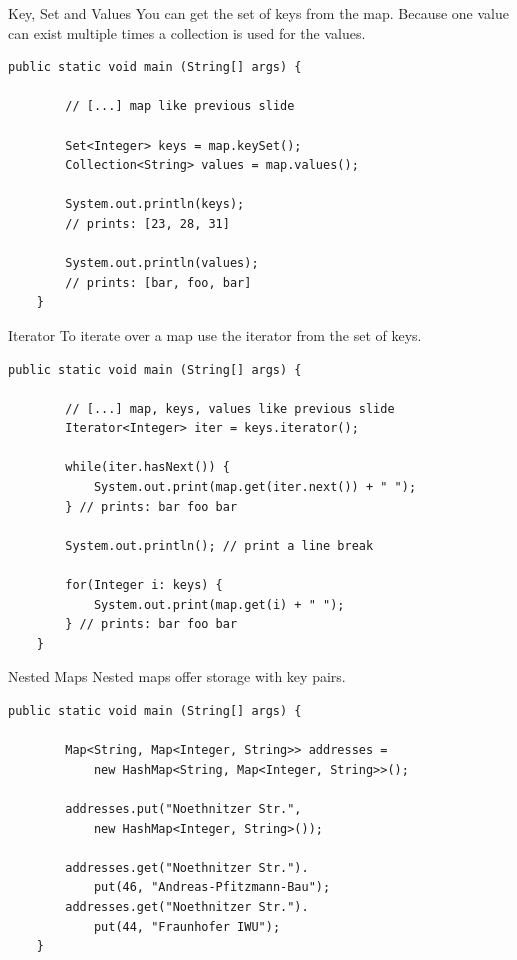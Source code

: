 \begin{frame}[fragile]{Key, Set and Values}
	You can get the set of keys from the map.
	Because one value can exist multiple times a collection is used for the values.
	\begin{lstlisting}[basicstyle=\ttfamily\scriptsize]
	public static void main (String[] args) {
	
	    // [...] map like previous slide
	    
	    Set<Integer> keys = map.keySet();
	    Collection<String> values = map.values();
	    
	    System.out.println(keys);
	    // prints: [23, 28, 31]
	    
	    System.out.println(values);
	    // prints: [bar, foo, bar]
	}
	\end{lstlisting}
\end{frame}

\begin{frame}[fragile]{Iterator}
	To iterate over a map use the iterator from the set of keys.
	\begin{lstlisting}[basicstyle=\ttfamily\scriptsize]
	public static void main (String[] args) {
	
	    // [...] map, keys, values like previous slide    	    
	    Iterator<Integer> iter = keys.iterator();
	    
	    while(iter.hasNext()) {
	        System.out.print(map.get(iter.next()) + " ");
	    } // prints: bar foo bar
	    
	    System.out.println(); // print a line break
	    
	    for(Integer i: keys) {
	        System.out.print(map.get(i) + " ");
	    } // prints: bar foo bar
	}
	\end{lstlisting}
\end{frame}

\begin{frame}[fragile]{Nested Maps}
	Nested maps offer storage with key pairs.
	\begin{lstlisting}[basicstyle=\ttfamily\scriptsize]
	public static void main (String[] args) {		
	
	    Map<String, Map<Integer, String>> addresses = 
		    new HashMap<String, Map<Integer, String>>();
		
	    addresses.put("Noethnitzer Str.", 
	        new HashMap<Integer, String>());
		
	    addresses.get("Noethnitzer Str.").
	        put(46, "Andreas-Pfitzmann-Bau");
	    addresses.get("Noethnitzer Str.").
	        put(44, "Fraunhofer IWU");
	}
	\end{lstlisting}
\end{frame}

